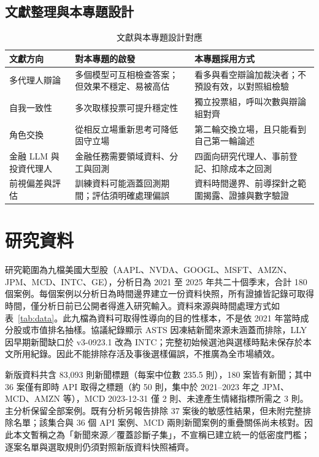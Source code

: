 \documentclass[12pt,a4paper]{article}
\begin{document}
\begin{CJK}{UTF8}{bkai}
\subsection{文獻整理與本專題設計}

\begin{table}[H]
\centering\small
\caption{文獻與本專題設計對應}
\label{tab:litmap}
\begin{tabularx}{\textwidth}{@{}l Y Y@{}}
\toprule
文獻方向 & 對本專題的啟發 & 本專題採用方式 \\
\midrule
多代理人辯論 & 多個模型可互相檢查答案；但效果不穩定、易被高估 & 看多與看空辯論加裁決者；不預設有效，以對照組檢驗 \\
自我一致性 & 多次取樣投票可提升穩定性 & 獨立投票組，呼叫次數與辯論組對齊 \\
角色交換 & 從相反立場重新思考可降低固守立場 & 第二輪交換立場，且只能看到自己第一輪論述 \\
金融 LLM 與投資代理人 & 金融任務需要領域資料、分工與回測 & 四面向研究代理人、事前登記、扣除成本之回測 \\
前視偏差與評估 & 訓練資料可能涵蓋回測期間；評估須明確處理偏誤 & 資料時間邊界、前導探針之範圍揭露、證據與數字驗證 \\
\bottomrule
\end{tabularx}
\end{table}

\section{研究資料}
\label{sec:data}

研究範圍為九檔美國大型股（AAPL、\allowbreak NVDA、\allowbreak GOOGL、\allowbreak MSFT、\allowbreak AMZN、\allowbreak JPM、\allowbreak MCD、\allowbreak INTC、\allowbreak GE），分析日為 2021 至 2025 年共二十個季末，合計 180 個案例。每個案例以分析日為時間邊界建立一份資料快照，所有證據皆記錄可取得時間，僅分析日前已公開者得進入研究輸入。資料來源與時間處理方式如表~\ref{tab:data}。此九檔為資料可取得性導向的目的性樣本，不是依 2021 年當時成分股或市值排名抽樣。協議紀錄顯示 ASTS 因凍結新聞來源未涵蓋而排除，LLY 因早期新聞缺口於 v3-0923.1 改為 INTC；完整初始候選池與選樣時點未保存於本文所用紀錄。因此不能排除存活及事後選樣偏誤，不推廣為全市場績效。

新版資料共含 83,093 則新聞標題（每案中位數 235.5 則），180 案皆有新聞；其中 36 案僅有即時 API 取得之標題（約 50 則，集中於 2021--2023 年之 JPM、MCD、AMZN 等），MCD 2023-12-31 僅 2 則、未達產生情緒指標所需之 3 則。主分析保留全部案例。既有分析另報告排除 37 案後的敏感性結果，但未附完整排除名單；該集合與 36 個 API 案例、MCD 兩則新聞案例的重疊關係尚未核對。因此本文暫稱之為「新聞來源／覆蓋診斷子集」，不宣稱已建立統一的低密度門檻；逐案名單與選取規則仍須對照新版資料快照補齊。


\end{CJK}
\end{document}
